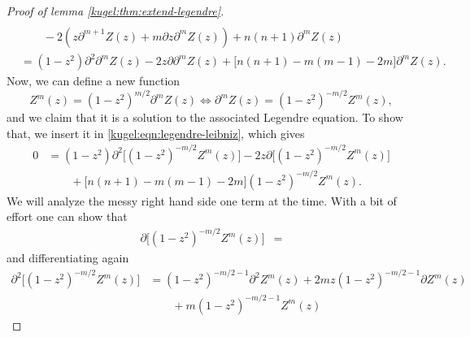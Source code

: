 \begin{proof}[Proof of lemma \ref{kugel:thm:extend-legendre}]
\begin{align}
    \nonumber \\
    &\qquad - 2 \left(
      z \partial^{m+1} Z(z)
      + m\partial z \partial^m Z(z)
    \right)
    + n(n+1) \partial^m Z(z)
    \nonumber \\
    &= (1-z^2) \partial^2 \partial^m Z(z)
    - 2z \partial \partial^m Z(z)
    + \bigl[ n(n + 1) - m(m-1) - 2m \bigr] \partial^m Z(z).
    \label{kugel:eqn:legendre-leibniz}
  \end{align}
  Now, we can define a new function
  \begin{equation*}
    Z^m(z) = (1-z^2)^{m/2} \partial^m Z(z)
    \iff
    \partial^m Z(z) = (1-z^2)^{-m/2} Z^m(z),
  \end{equation*}
  and we claim that it is a solution to the associated Legendre equation. To
  show that, we insert it in \eqref{kugel:eqn:legendre-leibniz}, which gives
  \begin{align*}
    0 &= (1-z^2) \partial^2 \bigl[ (1-z^2)^{-m/2} Z^m(z) \bigr]
    - 2z\partial \bigl[ (1-z^2)^{-m/2} Z^m(z) \bigr]
    \\
    &\qquad + \bigl[ n(n + 1) - m(m-1) - 2m \bigr] (1-z^2)^{-m/2} Z^m(z).
  \end{align*}
  We will analyze the messy right hand side one term at the time. With a bit of
  effort one can show that
  \begin{align*}
    \partial \bigl[ (1-z^2)^{-m/2} Z^m(z) \bigr]
      &=
  \end{align*}
  and differentiating again
  \begin{align*}
    \partial^2 \bigl[ (1-z^2)^{-m/2} Z^m(z) \bigr]
      &= (1-z^2)^{-m/2-1} \partial^2 Z^m(z)
        + 2mz(1-z^2)^{-m/2 -1} \partial Z^m(z) \\
        &\qquad + m (1-z^2)^{-m/2-1} Z^m(z) 

\end{align*}
\end{proof}
